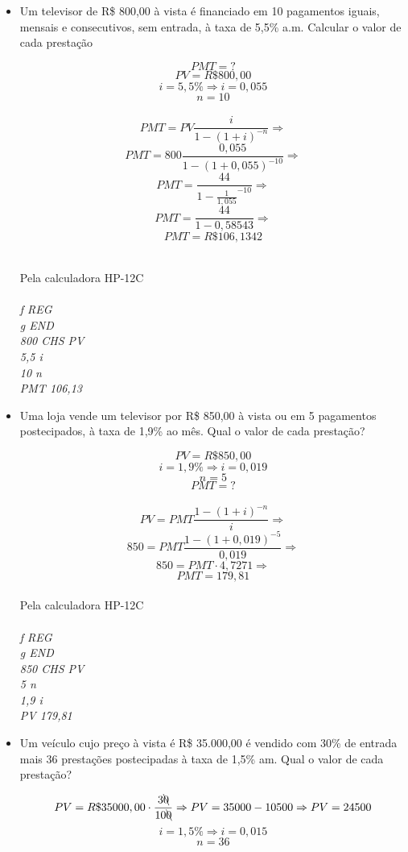 \documentclass[a4paper, 12pt]{article}
\begin{document}
\begin{itemize}

\item Um televisor de R\$ 800,00 à vista é financiado em 10 pagamentos iguais, 
mensais e consecutivos, sem entrada, à taxa de 5,5\% a.m. Calcular o valor de 
cada prestação
  
$$ PMT = ? $$
$$ PV = R\$800,00 $$
$$ i = 5,5\% \Rightarrow i = 0,055 $$
$$ n = 10 $$
\\
$$ PMT = PV\frac{i}{1-(1+i)^{-n}} \Rightarrow $$
$$ PMT = 800\frac{0,055}{1-(1+0,055)^{-10}} \Rightarrow $$
$$ PMT = \frac{44}{1-\frac{1}{1,055}^{-10}} \Rightarrow $$
$$ PMT = \frac{44}{1-0,58543} \Rightarrow $$
$$ \boxed{PMT = R\$106,1342} $$

\\

Pela calculadora HP-12C\\\\
\emph{f REG}\\
\emph{g END}\\
\emph{800 CHS PV}\\
\emph{5,5 i}\\
\emph{10 n}\\
\emph{PMT 106,13}

\item  Uma loja vende um televisor por R\$ 850,00 à vista ou em 5 pagamentos postecipados, à taxa de 1,9\% ao mês. Qual o valor de cada prestação?
  
$$ PV = R\$850,00 $$
$$ i = 1,9\% \Rightarrow i = 0,019 $$
$$ n = 5 $$
$$ PMT = ? $$  
\\
$$ PV = PMT\frac{1-(1+i)^{-n}}{i} \Rightarrow $$
$$ 850 = PMT\frac{1-(1+0,019)^{-5}}{0,019} \Rightarrow $$
$$ 850 = PMT \cdot 4,7271 \Rightarrow $$
$$ \boxed{PMT = 179,81} $$
\\
Pela calculadora HP-12C\\\\
\emph{f REG}\\
\emph{g END}\\
\emph{850 CHS PV}\\
\emph{5 n}\\
\emph{1,9 i}\\
\emph{PV 179,81}  

\item Um veículo cujo preço à vista é R\$ 35.000,00 é vendido com 30\% de 
entrada mais 36 prestações postecipadas à taxa de 1,5\% am. Qual o valor de 
cada prestação?

$$ PV = R\$35000,00 \cdot \frac{3\bcancel{0}}{10\bcancel{0}} \Rightarrow PV = 35000 - 10500 \Rightarrow PV = 24500 $$
$$ i = 1,5\% \Rightarrow i = 0,015 $$
$$ n = 36 $$


\end{itemize}
\end{document}
